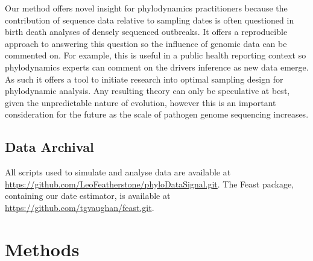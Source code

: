 \documentclass{article}
\begin{document}
Our method offers novel insight for phylodynamics practitioners because the contribution of sequence data relative to sampling dates is often questioned in birth death analyses of densely sequenced outbreaks. It offers a reproducible approach to answering this question so the influence of genomic data can be commented on. For example, this is useful in a public health reporting context so phylodynamics experts can comment on the drivers inference as new data emerge. As such it offers a tool to initiate research into optimal sampling design for phylodynamic analysis. Any resulting theory can only be speculative at best, given the unpredictable nature of evolution, however this is an important consideration for the future as the scale of pathogen genome sequencing increases.

\subsection*{Data Archival}
All scripts used to simulate and analyse data are available at \url{https://github.com/LeoFeatherstone/phyloDataSignal.git}. The Feast package, containing our date estimator, is available at \url{https://github.com/tgvaughan/feast.git}.
\section*{Methods}
\end{document}
